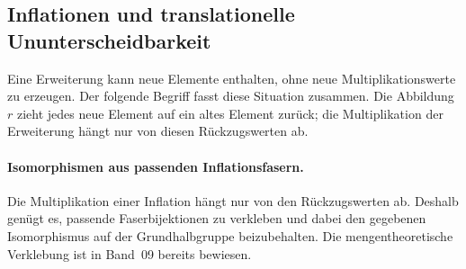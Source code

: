 \documentclass[main.tex]{subfiles}
\begin{document}
\subsection{Inflationen und translationelle Ununterscheidbarkeit}

Eine Erweiterung kann neue Elemente enthalten, ohne neue Multiplikationswerte
zu erzeugen.  Der folgende Begriff fasst diese Situation zusammen.  Die
Abbildung \(r\) zieht jedes neue Element auf ein altes Element zurück; die
Multiplikation der Erweiterung hängt nur von diesen Rückzugswerten ab.


\paragraph{Isomorphismen aus passenden Inflationsfasern.}
Die Multiplikation einer Inflation hängt nur von den Rückzugswerten ab.
Deshalb genügt es, passende Faserbijektionen zu verkleben und dabei den
gegebenen Isomorphismus auf der Grundhalbgruppe beizubehalten.
Die mengentheoretische Verklebung ist in Band~09 bereits bewiesen.
\end{document}
